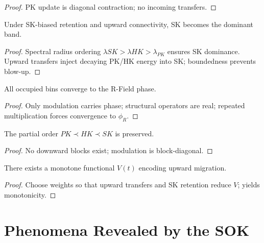 \documentclass[11pt]{article}
\begin{document}
\begin{proof}
PK update is diagonal contraction; no incoming transfers.
\end{proof}

\begin{theorem}
Under SK-biased retention and upward connectivity, SK becomes the dominant band.
\end{theorem}

\begin{proof}
Spectral radius ordering $\lambda{SK}>\lambda{HK}>\lambda_{PK}$ ensures SK 
dominance. Upward transfers inject decaying PK/HK energy into SK; boundedness 
prevents blow-up.
\end{proof}

\begin{theorem}
All occupied bins converge to the R-Field phase.
\end{theorem}

\begin{proof}
Only modulation carries phase; structural operators are real; repeated 
multiplication forces convergence to $\phi_R$.
\end{proof}

\begin{theorem}
The partial order $PK\prec HK\prec SK$ is preserved.
\end{theorem}

\begin{proof}
No downward blocks exist; modulation is block-diagonal.
\end{proof}

\begin{theorem}
There exists a monotone functional $V(t)$ encoding upward migration.
\end{theorem}

\begin{proof}
Choose weights so that upward transfers and SK retention reduce $V$; yields 
monotonicity.
\end{proof}

\section{Phenomena Revealed by the SOK}
\end{document}
